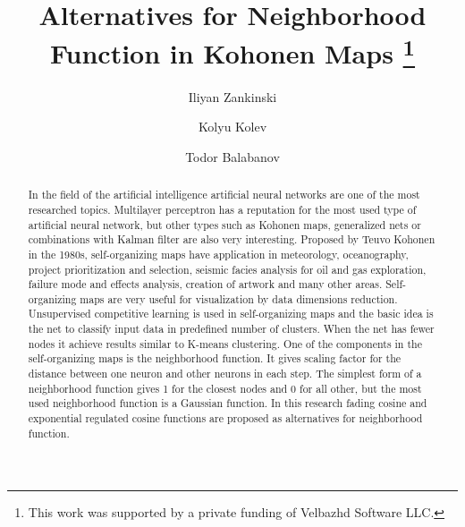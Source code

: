 \documentclass[runningheads]{llncs}
\begin{document}
\title{Alternatives for Neighborhood Function in Kohonen Maps \thanks{This work was supported by a private funding of Velbazhd Software LLC.}}

\author{Iliyan Zankinski \and
Kolyu Kolev \and
Todor Balabanov}


\maketitle

\begin{abstract}
In the field of the artificial intelligence artificial neural networks are one of the most researched topics. Multilayer perceptron has a reputation for the most used type of artificial neural network, but other types such as Kohonen maps, generalized nets\cite{tashev01} or combinations with Kalman filter\cite{alexandrov01,voort01} are also very interesting. Proposed by Teuvo Kohonen in the 1980s, self-organizing maps have application in meteorology, oceanography, project prioritization and selection, seismic facies analysis for oil and gas exploration, failure mode and effects analysis, creation of artwork and many other areas. Self-organizing maps are very useful for visualization by data dimensions reduction. Unsupervised competitive learning is used in self-organizing maps and the basic idea is the net to classify input data in predefined number of clusters. When the net has fewer nodes it achieve results similar to K-means clustering. One of the components in the self-organizing maps is the neighborhood function. It gives scaling factor for the distance between one neuron and other neurons in each step. The simplest form of a neighborhood function gives 1 for the closest nodes and 0 for all other, but the most used neighborhood function is a Gaussian function. In this research fading cosine and exponential regulated cosine functions are proposed as alternatives for neighborhood function.

\end{abstract}
\end{document}
